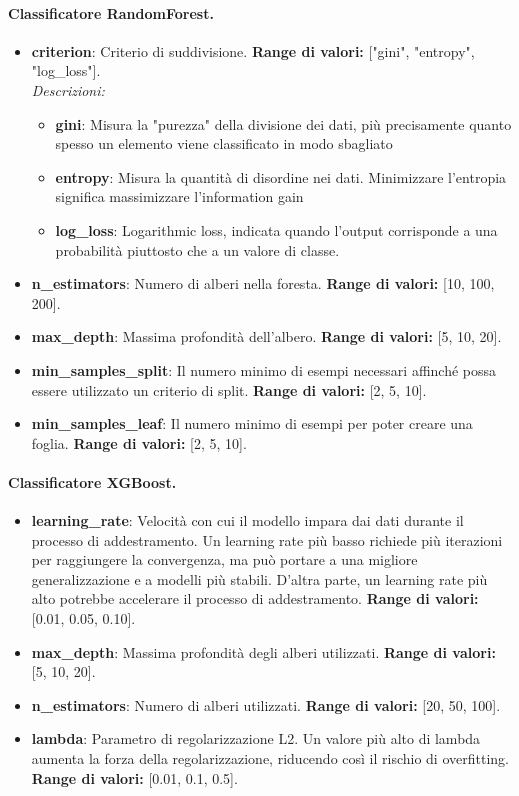 \noindent\paragraph{Classificatore RandomForest.}
\begin{itemize}[leftmargin=*]
    \item \textbf{criterion}: Criterio di suddivisione. \textbf{Range di valori:} ["gini", "entropy", "log\_loss"].\\
          \textit{Descrizioni:}
          \begin{itemize}
              \item \textbf{gini}: Misura la "purezza" della divisione dei dati, più precisamente quanto spesso un elemento viene classificato in modo sbagliato
              \item \textbf{entropy}: Misura la quantità di disordine nei dati. Minimizzare l'entropia significa massimizzare l'information gain
              \item \textbf{log\_loss}: Logarithmic loss, indicata quando l'output corrisponde a
              una probabilità piuttosto che a un valore di classe.
          \end{itemize}
    \item \textbf{n\_estimators}: Numero di alberi nella foresta. \textbf{Range di valori:} [10, 100, 200].
    \item \textbf{max\_depth}: Massima profondità dell'albero. \textbf{Range di valori:} [5, 10, 20].
    \item \textbf{min\_samples\_split}: Il numero minimo di esempi necessari affinché possa essere utilizzato un criterio di split. \textbf{Range di valori:} [2, 5, 10].
    \item \textbf{min\_samples\_leaf}: Il numero minimo di esempi per poter creare una foglia. \textbf{Range di valori:} [2, 5, 10].
\end{itemize}

\noindent\paragraph{Classificatore XGBoost.}
\begin{itemize}[leftmargin=*]
    \item \textbf{learning\_rate}: Velocità con cui il modello impara dai dati durante il processo di addestramento. Un learning rate più basso richiede più iterazioni per raggiungere la convergenza, ma può portare a una migliore generalizzazione e a modelli più stabili. D'altra parte, un learning rate più alto potrebbe accelerare il processo di addestramento. \textbf{Range di valori:} [0.01, 0.05, 0.10].
    \item \textbf{max\_depth}: Massima profondità degli alberi utilizzati. \textbf{Range di valori:} [5, 10, 20].
    \item \textbf{n\_estimators}: Numero di alberi utilizzati. \textbf{Range di valori:} [20, 50, 100].
    \item \textbf{lambda}: Parametro di regolarizzazione L2. Un valore più alto di lambda aumenta la forza della regolarizzazione, riducendo così il rischio di overfitting. \textbf{Range di valori:} [0.01, 0.1, 0.5].
\end{itemize}

